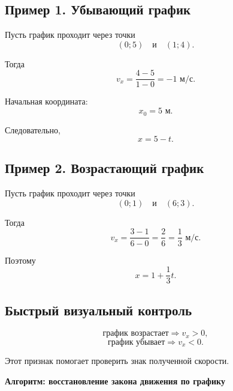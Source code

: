 \documentclass[a4paper,12pt]{article}
\begin{document}
\subsection*{Пример 1. Убывающий график}

Пусть график проходит через точки
\[
(0;5)
\quad\text{и}\quad
(1;4).
\]

Тогда
\[
v_x=\frac{4-5}{1-0}=-1\text{ м/с}.
\]

Начальная координата:
\[
x_0=5\text{ м}.
\]

Следовательно,
\[
\boxed{x=5-t}.
\]

\subsection*{Пример 2. Возрастающий график}

Пусть график проходит через точки
\[
(0;1)
\quad\text{и}\quad
(6;3).
\]

Тогда
\[
v_x=\frac{3-1}{6-0}
=
\frac26
=
\frac13\text{ м/с}.
\]

Поэтому
\[
\boxed{x=1+\frac13t}.
\]

\subsection*{Быстрый визуальный контроль}

\[
\text{график возрастает}
\Longrightarrow
v_x>0,
\]
\[
\text{график убывает}
\Longrightarrow
v_x<0.
\]

Этот признак помогает проверить знак полученной скорости.


\clearpage
\thispagestyle{empty}

\begin{center}
{\LARGE\bfseries\color{darkaccent}
Алгоритм: восстановление закона движения по графику}
\end{center}

\vspace{8mm}
\end{document}
